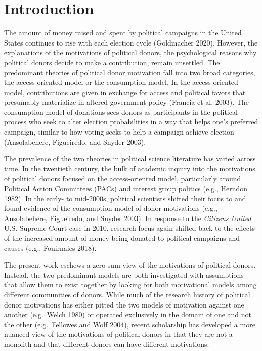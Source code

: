 \documentclass[12pt,]{article}
\begin{document}
\noindent \doublespacing 

\hypertarget{introduction}{%
\section{Introduction}\label{introduction}}

The amount of money raised and spent by political campaigns in the
United States continues to rise with each election cycle (Goldmacher
2020). However, the explanations of the motivations of political donors,
the psychological reasons why political donors decide to make a
contribution, remain unsettled. The predominant theories of political
donor motivation fall into two broad categories, the access-oriented
model or the consumption model. In the access-oriented model,
contributions are given in exchange for access and political favors that
presumably materialize in altered government policy (Francia et al.
2003). The consumption model of donations sees donors as participants in
the political process who seek to alter election probabilities in a way
that helps one's preferred campaign, similar to how voting seeks to help
a campaign achieve election (Ansolabehere, Figueiredo, and Snyder 2003).

The prevalence of the two theories in political science literature has
varied across time. In the twentieth century, the bulk of academic
inquiry into the motivations of political donors focused on the
access-oriented model, particularly around Political Action Committees
(PACs) and interest group politics (e.g., Herndon 1982). In the early-
to mid-2000s, political scientists shifted their focus to and found
evidence of the consumption model of donor motivations (e.g.,
Ansolabehere, Figueiredo, and Snyder 2003). In response to the
\emph{Citizens United} U.S. Supreme Court case in 2010, research focus
again shifted back to the effects of the increased amount of money being
donated to political campaigns and causes (e.g., Fouirnaies 2018).

The present work eschews a zero-sum view of the motivations of political
donors. Instead, the two predominant models are both investigated with
assumptions that allow them to exist together by looking for both
motivational models among different communities of donors. While much of
the research history of political donor motivations has either pitted
the two models of motivation against one another (e.g.~Welch 1980) or
operated exclusively in the domain of one and not the other
(e.g.~Fellowes and Wolf 2004), recent scholarship has developed a more
nuanced view of the motivations of political donors in that they are not
a monolith and that different donors can have different motivations.
\end{document}
